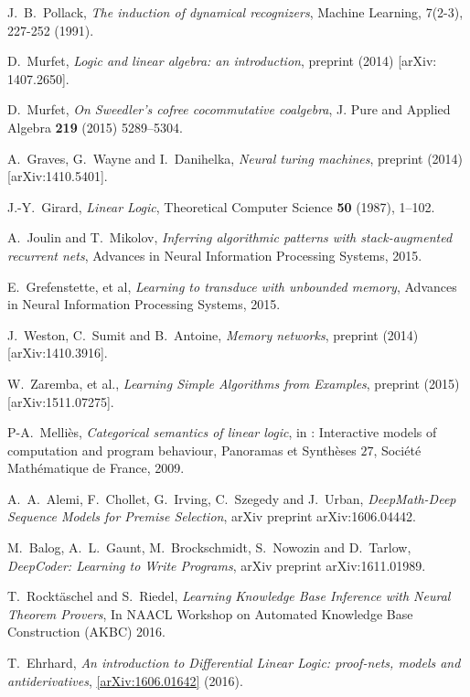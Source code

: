 \documentclass[english,letter paper,12pt,leqno]{article}
\theoremstyle{example}
\numberwithin{equation}{section}
\begin{document}
\begin{thebibliography}{BHLS03}
J.~B.~Pollack, \textsl{The induction of dynamical recognizers}, Machine Learning, 7(2-3), 227-252 (1991). 

D.~Murfet, \textsl{Logic and linear algebra: an introduction}, preprint (2014) [arXiv: 1407.2650].

D.~Murfet, \textsl{On Sweedler's cofree cocommutative coalgebra}, J. Pure and Applied Algebra \textbf{219} (2015) 5289--5304.

A.~Graves, G.~Wayne and I.~Danihelka, \textsl{Neural turing machines}, preprint (2014) [arXiv:1410.5401].

J.-Y.~Girard, \textsl{Linear Logic}, Theoretical Computer Science \textbf{50} (1987), 1--102.

A.~Joulin and T.~Mikolov, \textsl{Inferring algorithmic patterns with stack-augmented recurrent nets}, Advances in Neural Information Processing Systems, 2015.

E.~Grefenstette, et al, \textsl{Learning to transduce with unbounded memory}, Advances in Neural Information Processing Systems, 2015.

J.~Weston, C.~Sumit and B.~Antoine, \textsl{Memory networks}, preprint (2014) [arXiv:1410.3916].

W.~Zaremba, et al., \textsl{Learning Simple Algorithms from Examples}, preprint (2015) [arXiv:1511.07275].

P-A.~Melli\`{e}s, \textsl{Categorical semantics of linear logic}, in : Interactive models of computation and program behaviour, Panoramas et Synth\`{e}ses $27$, Soci\'{e}t\'{e} Math\'{e}matique de France, 2009.

A.~A.~Alemi, F.~Chollet, G.~Irving, C.~Szegedy and J.~Urban, \textsl{DeepMath-Deep Sequence Models for Premise Selection}, arXiv preprint arXiv:1606.04442.

M.~Balog, A.~L.~Gaunt, M.~Brockschmidt, S.~Nowozin and D.~Tarlow, \textsl{DeepCoder: Learning to Write Programs}, arXiv preprint arXiv:1611.01989.

T.~Rockt\"aschel and S.~Riedel, \textsl{Learning Knowledge Base Inference with Neural Theorem Provers}, In NAACL Workshop on Automated Knowledge Base Construction (AKBC) 2016.

T.~Ehrhard, \textsl{An introduction to Differential Linear Logic: proof-nets, models and antiderivatives}, \href{https://arxiv.org/abs/1606.01642}{[arXiv:1606.01642]} (2016).


\end{thebibliography}
\end{document}
